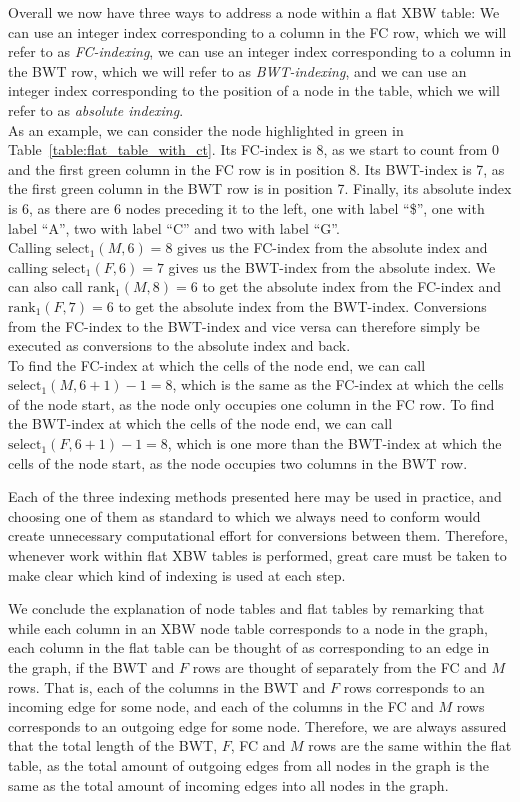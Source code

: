\documentclass[a4paper,12pt,twoside,BCOR=10mm]{scrbook}
\begin{document}
Overall we now have three ways to address a node within a flat XBW table:
We can use an integer index corresponding to a column in the FC row,
which we will refer to as \textit{FC-indexing}\label{def:fc_indexing},
we can use an integer index corresponding to a column in the BWT row,
which we will refer to as \textit{BWT-indexing}\label{def:bwt_indexing},
and we can use an integer index corresponding to the position of a node in the table,
which we will refer to as \textit{absolute indexing}\label{def:absolute_indexing}. \\
As an example, we can consider the node highlighted in green in Table~\ref{table:flat_table_with_ct}.
Its FC-index is 8, as we start to count from 0 and the first green column in the FC row is in position 8.
Its BWT-index is 7, as the first green column in the BWT row is in position 7.
Finally, its absolute index is 6, as there are 6 nodes preceding it to the left, one
with label “\$”, one with label “A”, two with label “C” and two with label “G”. \\
Calling $ \textrm{select}_1 ( M, 6 ) = 8 $ gives us the FC-index from the absolute index and
calling $ \textrm{select}_1 ( F, 6 ) = 7 $ gives us the BWT-index from the absolute index.
We can also call $ \textrm{rank}_1 ( M, 8 ) = 6 $ to get the absolute index from the FC-index
and $ \textrm{rank}_1 ( F, 7 ) = 6 $ to get the absolute index from the BWT-index.
Conversions from the FC-index to the BWT-index and vice versa can therefore simply be executed as conversions
to the absolute index and back. \\
To find the FC-index at which the cells of the node end,
we can call $ \textrm{select}_1 ( M, 6 + 1 ) - 1 = 8 $, which
is the same as the FC-index at which the cells of the node start, as the node
only occupies one column in the FC row.
To find the BWT-index at which the cells of the node end,
we can call $ \textrm{select}_1 ( F, 6 + 1 ) - 1 = 8 $, which
is one more than the BWT-index at which the cells of the node start,
as the node occupies two columns in the BWT row.

Each of the three indexing methods presented here
may be used in practice, and choosing one of them as standard to which
we always need to conform would create unnecessary computational effort for conversions
between them.
Therefore, whenever work within flat XBW tables is performed, great care must be taken
to make clear which kind of indexing is used at each step.

We conclude the explanation of node tables and flat tables by remarking that while each column
in an XBW node table corresponds to a node in the graph,
each column in the flat table can be thought of as corresponding to an edge in the graph,
if the BWT and $ F $ rows are thought of separately from the FC and $ M $ rows.
That is, each of the columns in the BWT and $ F $ rows corresponds to an incoming edge for some node,
and each of the columns in the FC and $ M $ rows corresponds to an outgoing edge for some node.
Therefore, we are always assured that the total length of the BWT, $ F $, FC and $ M $ rows are the same
within the flat table, as the total amount of outgoing edges from all nodes in the graph is
the same as the total amount of incoming edges into all nodes in the graph.
\end{document}
